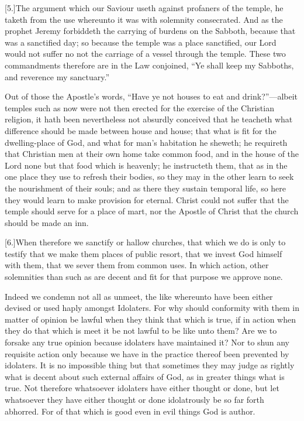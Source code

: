 [5.]The argument which our Saviour useth against profaners of the temple, he taketh from the use whereunto it was with solemnity consecrated. And as the prophet Jeremy forbiddeth the carrying of burdens on the Sabboth, because that was a sanctified day; so because the temple was a place sanctified, our Lord would not suffer no not the carriage of a vessel through the temple. These two commandments therefore are in the Law conjoined, “Ye shall keep my Sabboths, and reverence my sanctuary.”

Out of those the Apostle’s words, “Have ye not houses to eat and drink?”—albeit temples such as now were not then erected for the exercise of the Christian religion, it hath been nevertheless not absurdly conceived that he teacheth  what difference should be made between house and house; that what is fit for the dwelling-place of God,
 and what for man’s habitation he sheweth; he requireth that Christian men at their own home take common food, and in the house of the Lord none but that food which is heavenly; he instructeth them, that as in the one place they use to refresh their bodies, so they may in the other learn to seek the nourishment of their souls; and as there they sustain temporal life, so here they would learn to make provision for eternal. Christ could not suffer that the temple should serve for a place of mart, nor the Apostle of Christ that the church should be made an inn.

[6.]When therefore we sanctify or hallow churches, that which we do is only to testify that we make them places of public resort, that we invest God himself with them, that we sever them from common uses. In which action, other solemnities than such as are decent and fit for that purpose we approve none.

Indeed we condemn not all as unmeet, the like whereunto have been either devised or used haply amongst Idolaters. For why should conformity with them in matter of opinion be lawful when they think that which is true, if in action when they do that which is meet it be not lawful to be like unto them? Are we to forsake any true opinion because idolaters have maintained it? Nor to shun any requisite action only  because we have in the practice thereof been prevented by idolaters.
 It is no impossible thing but that sometimes they may judge as rightly what is decent about such external affairs of God, as in greater things what is true. Not therefore whatsoever idolaters have either thought or done, but let whatsoever they have either thought or done idolatrously be so far forth abhorred. For of that which is good even in evil things God is author.


